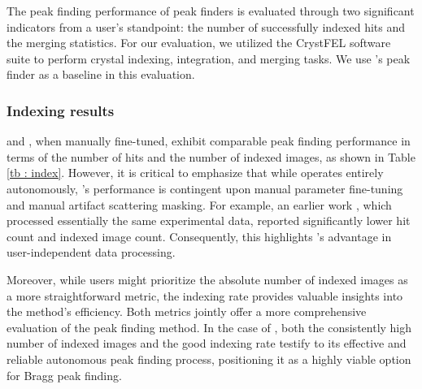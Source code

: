 \documentclass[a4paper]{article}
\begin{document}
The peak finding performance of peak finders is evaluated through two
significant indicators from a user's standpoint: the number of successfully
indexed hits and the merging statistics.  For our evaluation, we utilized the
CrystFEL software suite \citep{whiteCrystFELSoftwareSuite2012} to perform
crystal indexing, integration, and merging tasks.  We use \psocake{}'s peak
finder as a baseline in this evaluation.

\subsubsection{Indexing results}

\peaknet{} and \psocake{}, when manually fine-tuned, exhibit comparable peak
finding performance in terms of the number of hits and the number of indexed
images, as shown in Table \ref{tb : index}.  However, it is critical to
emphasize that while \peaknet{} operates entirely autonomously, \psocake{}'s
performance is contingent upon manual parameter fine-tuning and manual artifact
scattering masking.  For example, an earlier work
\citep{suSerialCrystallographyUsing2021}, which processed essentially the same
experimental data, reported significantly lower hit count and indexed image
count.  Consequently, this highlights \peaknet{}'s advantage in user-independent
data processing.

Moreover, while users might prioritize the absolute number of indexed images as
a more straightforward metric, the indexing rate provides valuable insights into
the method's efficiency.  Both metrics jointly offer a more comprehensive
evaluation of the peak finding method. In the case of \peaknet{}, both the
consistently high number of indexed images and the good indexing rate testify to
its effective and reliable autonomous peak finding process, positioning it as a
highly viable option for Bragg peak finding.
\end{document}
